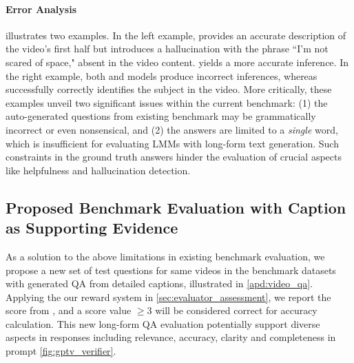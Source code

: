 \paragraph{Error Analysis}  illustrates two examples. In the left example, \modelsft provides an accurate description of the video's first half but introduces a hallucination with the phrase ``I'm not scared of space," absent in the video content. \modelname yields a more accurate inference. In the right example, both \modelsft and \videollava models produce incorrect inferences, whereas \modelname successfully correctly identifies the subject in the video. More critically, these examples unveil two significant issues within the current benchmark: (1) the auto-generated questions from existing benchmark may be grammatically incorrect or even nonsensical, and (2) the answers are limited to a \textit{single} word, which is insufficient for evaluating LMMs with long-form text generation. Such constraints in the ground truth answers hinder the evaluation of crucial aspects like helpfulness and hallucination detection.

\subsection{Proposed Benchmark Evaluation with \gptv Caption as Supporting Evidence}
As a solution to the above limitations in existing benchmark evaluation, we propose a new set of test questions for same videos in the benchmark datasets with generated QA from detailed captions, illustrated in \cref{apd:video_qa}. Applying the our reward system in \cref{sec:evaluator_assessment}, we report the score from \chatgpt, and a score value $\ge 3$ will be considered correct for accuracy calculation. This new long-form QA evaluation potentially support diverse aspects in responses including relevance, accuracy, clarity and completeness in prompt \ref{fig:gptv_verifier}.

